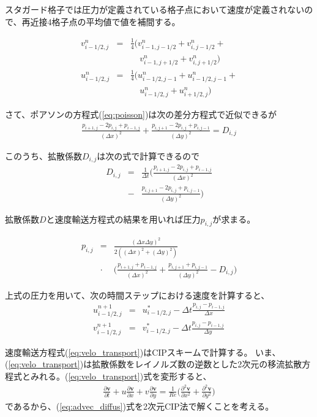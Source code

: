 \documentclass[twocolumn,oneside,a4paper]{article}
\begin{document}
スタガード格子では圧力が定義されている格子点において速度が定義されないので、再近接4格子点の平均値で値を補間する。

\begin{eqnarray*}
 v^n_{i-1/2,j} &=& \frac{1}{4}\bigg(v^n_{i-1,j-1/2}+v^n_{i,j-1/2} +\\
               &&\:\:\:\:\: v^n_{i-1,j+1/2}+v^n_{i,j+1/2}\bigg) \\
 u^n_{i-1/2,j} &=& \frac{1}{4}\bigg(u^n_{i-1/2,j-1}+u^n_{i-1/2,j-1} +\\
               &&\:\:\:\:\: u^n_{i-1/2,j}+u^n_{i+1/2,j}\bigg)
\end{eqnarray*}


さて、ポアソンの方程式(\ref{eq:poisson})は次の差分方程式で近似できるが
\begin{eqnarray*}
	\frac{p_{i+1,j}-2p_{i,j}+p_{i-1,j}}{(\Delta x)^2} + \frac{p_{i,j+1}-2p_{i,j}+p_{i,j-1}}{(\Delta y)^2} = D_{i,j}
\end{eqnarray*}

このうち、拡散係数$D_{i,j}$は次の式で計算できるので
\begin{eqnarray*}
	D_{i,j} &=& \frac{1}{\Delta t}\bigg( \frac{p_{i+1,j}-2p_{i,j}+p_{i-1,j}}{(\Delta x)^2}  \\
	&-& \frac{p_{i,j+1}-2p_{i,j}+p_{i,j-1}}{(\Delta y)^2} \bigg)
\end{eqnarray*}

拡散係数$D$と速度輸送方程式の結果を用いれば圧力$p_{i,j}$が求まる。

\begin{eqnarray*}
	p_{i,j} &=& \frac{(\Delta x \Delta y)^2}{2((\Delta x)^2+(\Delta y)^2)} \\
	&\cdot& \bigg( \frac{p_{i+1,j}+p_{i-1,j}}{(\Delta x)^2} + \frac{p_{i,j+1}+p_{i,j-1}}{(\Delta y)^2} - D_{i,j}\bigg)
\end{eqnarray*}

上式の圧力を用いて、次の時間ステップにおける速度を計算すると、
\begin{eqnarray*}
	u^{n+1}_{i-1/2,j} &=& u^\ast_{i-1/2,j} - \Delta t \frac{p_{i,j}-p_{i-1,j}}{\Delta x} \\
	v^{n+1}_{i-1/2,j} &=& v^\ast_{i-1/2,j} - \Delta t \frac{p_{i,j}-p_{i-1,j}}{\Delta y} 
\end{eqnarray*}

速度輸送方程式(\ref{eq:velo_transport})はCIPスキームで計算する。
いま、(\ref{eq:velo_transport})は拡散係数をレイノルズ数の逆数とした2次元の移流拡散方程式とみれる。(\ref{eq:velo_transport})式を変形すると、
\begin{eqnarray}\label{eq:advec_diffus}
\frac{\partial \bm{v}}{\partial t} + u\frac{\partial \bm{v}}{\partial x} + v\frac{\partial \bm{v}}{\partial y} = \frac{1}{Re} \bigg( \frac{\partial^2 \bm{v}}{\partial x^2} + \frac{\partial^2 \bm{v}}{\partial y^2} \bigg)
\end{eqnarray}
であるから、(\ref{eq:advec_diffus})式を2次元CIP法で解くことを考える。
\end{document}
